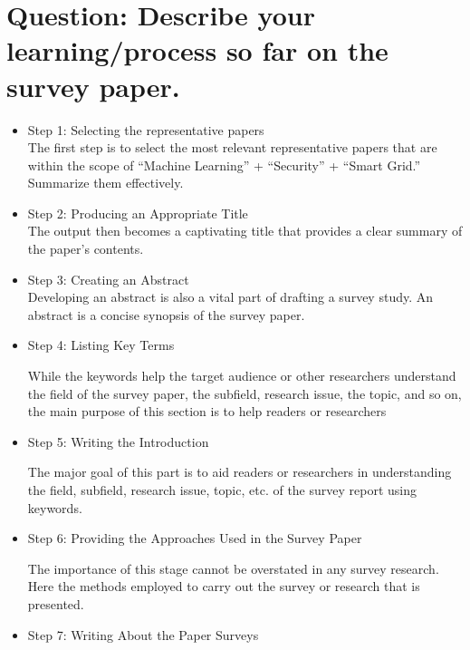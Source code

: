 

\section{Question: Describe your learning/process so far on the survey paper.}

\begin{itemize}
    \item Step 1: Selecting the representative papers 
    \\The first step is to select the most relevant representative papers that are within the scope of “Machine Learning” + “Security” + “Smart Grid.” 
    \\
    Summarize them effectively. 
    \\
    \item Step 2: Producing an Appropriate Title 
    \\The output then becomes a captivating title that provides a clear summary of the paper’s contents. 
    \\
    \item Step 3: Creating an Abstract
    \\Developing an abstract is also a vital part of drafting a survey study. An abstract is a concise synopsis of the survey paper. 
    \\
    \item Step 4: Listing Key Terms 
    
    While the keywords help the target audience or other researchers understand the field of the survey paper, the subfield, research issue, the topic, and so on, the main purpose of this section is to help readers or researchers 
    \\
    \item Step 5: Writing the Introduction 
    
    The major goal of this part is to aid readers or researchers in understanding the field, subfield, research issue, topic, etc. of the survey report using keywords. 
    \\
    \item Step 6: Providing the Approaches Used in the Survey Paper 
    
    The importance of this stage cannot be overstated in any survey research. Here the methods employed to carry out the survey or research that is presented. 
    \\
    \item Step 7: Writing About the Paper Surveys 
    

\end{itemize}

